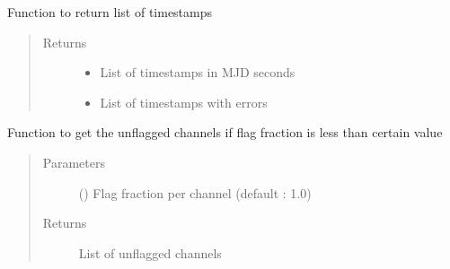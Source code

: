 \documentclass[letterpaper,10pt,english]{sphinxmanual}
\begin{document}
\begin{fulllineitems}
\begin{fulllineitems}
\end{fulllineitems}


\begin{fulllineitems}
\label{\detokenize{paircars:paircars.access_ms.AccessMS.get_timestamps_in_mjdsecs}}
\sphinxAtStartPar
Function to return list of timestamps
\begin{quote}\begin{description}
\item[{Returns}] \leavevmode
\sphinxAtStartPar
\begin{itemize}
\item {} 
\sphinxAtStartPar
{} \textendash{} List of timestamps in MJD seconds

\item {} 
\sphinxAtStartPar
{} \textendash{} List of timestamps with errors

\end{itemize}


\end{description}\end{quote}

\end{fulllineitems}


\begin{fulllineitems}
\label{\detokenize{paircars:paircars.access_ms.AccessMS.get_unflag_chan}}
\sphinxAtStartPar
Function to get the unflagged channels if flag fraction is less than certain value
\begin{quote}\begin{description}
\item[{Parameters}] \leavevmode
\sphinxAtStartPar
{} () \textendash{} Flag fraction per channel (default : 1.0)

\item[{Returns}] \leavevmode
\sphinxAtStartPar
List of unflagged channels


\end{description}
\end{quote}
\end{fulllineitems}
\end{fulllineitems}
\end{document}
